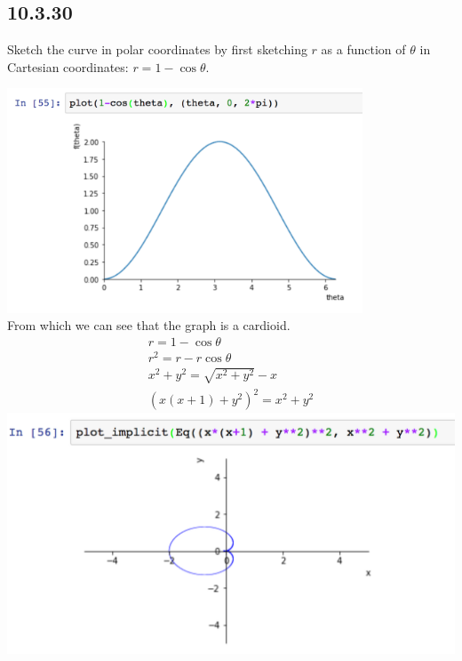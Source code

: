 \documentclass[12pt]{article}
\begin{document}
\newpage
\subsection*{10.3.30}
Sketch the curve in polar coordinates by first sketching $r$ as a function of
$\theta$ in Cartesian coordinates: $r = 1 - \cos\theta$.
\begin{mdframed}
  \includegraphics[width=300pt]{img/10-3-30.png}\\
  From which we can see that the graph is a cardioid.
  \begin{align*}
    r = 1 - \cos\theta\\
    r^2 = r - r\cos\theta\\
    x^2 + y^2 = \sqrt{x^2 + y^2} - x\\
    (x(x+1) + y^2)^2 = x^2 + y^2
  \end{align*}
  \includegraphics[width=400pt]{img/10-3-30-2.png}
\end{mdframed}
\end{document}
